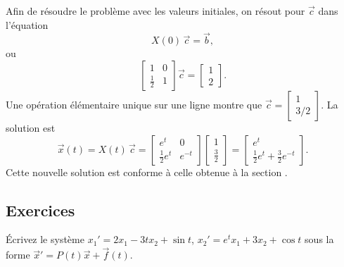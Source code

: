 \begin{example}
Afin de résoudre le problème avec les valeurs initiales, on résout pour $\vec{c}$ dans l'équation
\begin{equation*}
X(0)\,\vec{c} = \vec{b} ,
\end{equation*}
ou
\begin{equation*}
\begin{bmatrix}
1 & 0 \\
\frac{1}{2} & 1
\end{bmatrix} 
\vec{c} = 
\begin{bmatrix}
1 \\ 2
\end{bmatrix} .
\end{equation*}
Une opération élémentaire unique sur une ligne montre que
$\vec{c} =
\left[ \begin{smallmatrix} 1 \\ 3/2 \end{smallmatrix} \right]$.
La solution est
\begin{equation*}
\vec{x}(t) = 
X(t)\,\vec{c} = 
\begin{bmatrix}
e^t & 0 \\
\frac{1}{2} e^t & e^{-t}
\end{bmatrix}
\begin{bmatrix}
1 \\ \frac{3}{2}
\end{bmatrix} =
\begin{bmatrix}
e^t \\
\frac{1}{2} e^t + \frac{3}{2} e^{-t}
\end{bmatrix} .
\end{equation*}
Cette nouvelle solution est conforme à celle obtenue à la section .
\end{example}

\subsection{Exercices}

\begin{exercise}
Écrivez le système $x_1' = 2 x_1 - 3t x_2 + \sin t$,
$x_2' = e^t x_1 + 3 x_2 + \cos t$ sous la forme
${\vec{x}}' = P(t) \vec{x} + \vec{f}(t)$.
\end{exercise}

